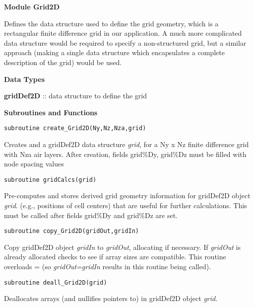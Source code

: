\documentclass[12pt]{article}
\begin{document}
\noindent
{\bf Module Grid2D}

Defines the data structure used to define the grid geometry,
which is a rectangular finite difference grid in our application.
A much more complicated data structure would be required to
specify a non-structured grid, but a similar approach (making
a single data structure which encapsulates a complete
description of the grid) would be used.

\vspace{10pt}

\noindent
{\bf Data Types}

\vspace{6pt}

\noindent
{\bf gridDef2D} :: data structure to define the grid

\vspace{10pt}

\noindent
{\bf Subroutines and Functions}

\begin{verbatim}
subroutine create_Grid2D(Ny,Nz,Nza,grid) 
\end{verbatim}

Creates and a gridDef2D data structure {\it grid}, for a Ny x Nz finite
difference grid with Nza air layers.  After creation,
fields grid\%Dy, grid\%Dz must be filled with node spacing values

\begin{verbatim}
subroutine gridCalcs(grid)
\end{verbatim}

Pre-computes and stores derived grid geometry information
for gridDef2D object {\it grid}.
(e.g., positions of cell centers) that are useful for further
calculations.  This must be called after fields grid\%Dy and grid\%Dz
are set.

\begin{verbatim}
subroutine copy_Grid2D(gridOut,gridIn) 
\end{verbatim}

Copy gridDef2D object {\it gridIn} to {\it gridOut}, allocating if necessary. 
If {\it gridOut} is already allocated checks to see if array sizes are 
compatible.  This routine overloads = (so {\it gridOut=gridIn}
results in this routine being called).

\begin{verbatim}
subroutine deall_Grid2D(grid) 
\end{verbatim}

Deallocates arrays (and nullifies pointers to) in
gridDef2D object {\it grid}.
\end{document}
